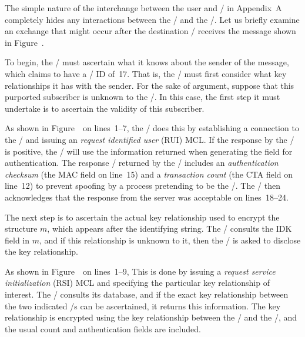 

The simple nature of the interchange between the user and \MH/
in Appendix~A completely hides any interactions between the \TMA/
and the \KDS/.
Let us briefly examine an exchange that might occur
after the destination \TMA/ receives the message shown in Figure~\before.

To begin,
the \TMA/ must ascertain what it knows about the sender of the message,
which claims to have a \KDS/ ID of~17.
That is,
the \TMA/ must first consider what key relationships it has with the sender.
For the sake of argument,
suppose that this purported subscriber is unknown to the \TMA/.
In this case,
the first step it must undertake is to ascertain the validity of this
subscriber.

As shown in Figure~\rui\ on lines~1--7,
the \TMA/ does this by establishing a connection to the \KDS/ and issuing an
{\it request identified user} (RUI) MCL.%
If the response by the \KDS/ is positive,
the \TMA/ will use the information returned when generating the
 field for authentication.
The response \CSM/ returned by the \KDS/ includes
an {\it authentication checksum} (the MAC field on line~15)
and a {\it transaction count} (the CTA field on line~12)
to prevent spoofing by a process pretending to be the \KDS/.
The \TMA/ then acknowledges that the response from the server was acceptable
on lines~18--24.

The next step is to ascertain the actual key relationship used to encrypt the
structure $m$, which appears after the identifying string.
The \TMA/ consults the IDK field in $m$,
and if this relationship is unknown to it,
then the \KDS/ is asked to disclose the key relationship.

As shown in Figure~\rsi\ on lines~1--9,
This is done by issuing a {\it request service initialization} (RSI) MCL
and specifying the particular key relationship of interest.
The \KDS/ consults its database,
and if the exact key relationship between the two indicated \TMA/s can be
ascertained,
it returns this information.
The key relationship
is encrypted using the key relationship between the \KDS/ and the \TMA/,
and the usual count and authentication fields are included.

